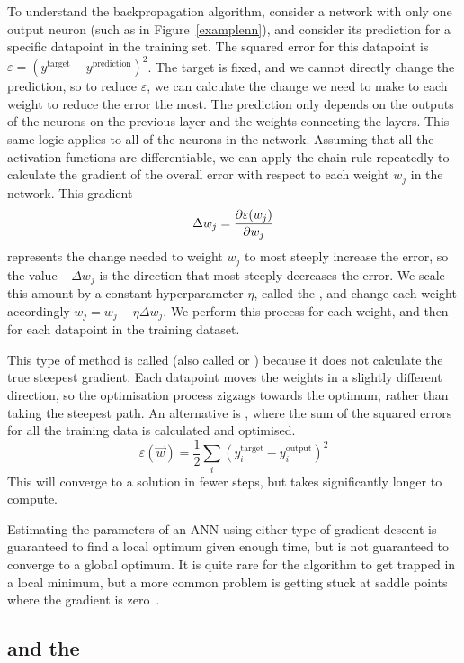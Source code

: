 To understand the backpropagation algorithm, consider a network with only one output neuron (such as in Figure~\ref{examplenn}), and consider its prediction for a specific datapoint in the training set.
The squared error for this datapoint is \(\varepsilon = \left(y^\text{target} - y^\text{prediction}\right)^2\).
The target is fixed, and we cannot directly change the prediction, so to reduce \(\varepsilon\), we can calculate the change we need to make to each weight to reduce the error the most.
The prediction only depends on the outputs of the neurons on the previous layer and the weights connecting the layers.
This same logic applies to all of the neurons in the network.
Assuming that all the activation functions are differentiable, we can apply the chain rule repeatedly to calculate the gradient of the overall error with respect to each weight \(w_j\) in the network.
This gradient
\[ \Delta w_j = \diffp{\varepsilon(w_j)}{w_j} \]
represents the change needed to weight \(w_j\) to most steeply increase the error, so the value \(-\Delta w_j\) is the direction that most steeply decreases the error.
We scale this amount by a constant hyperparameter \(\eta\), called the , and change each weight accordingly \(w_j = w_j - \eta \Delta w_j\).
We perform this process for each weight, and then for each datapoint in the training dataset.

This type of method is called  (also called  or ) because it does not calculate the true steepest gradient.
Each datapoint moves the weights in a slightly different direction, so the optimisation process zigzags towards the optimum, rather than taking the steepest path.
An alternative is , where the sum of the squared errors for all the training data is calculated and optimised.
\[ \varepsilon(\vec{w}) = \frac{1}{2} \sum_{i}\left(y_i^\text{target} - y_i^\text{output}\right)^2 \]
This will converge to a solution in fewer steps, but takes significantly longer to compute.

Estimating the parameters of an \ac{ANN} using either type of gradient descent is guaranteed to find a local optimum given enough time, but is not guaranteed to converge to a global optimum.
It is quite rare for the algorithm to get trapped in a local minimum, but a more common problem is getting stuck at saddle points where the gradient is zero~\autocite[438]{lecun2015}.

\subsection{\citeauthor{minsky1987} and the }

